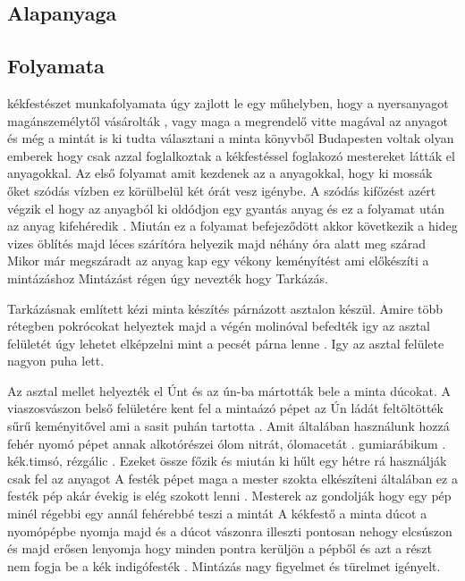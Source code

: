 \documentclass[fontsize=12pt, appendixprefix=true]{scrreprt}
\begin{document}
\subsection{Alapanyaga}




\subsection{Folyamata}
kékfestészet  munkafolyamata úgy zajlott le egy műhelyben, hogy a nyersanyagot magánszemélytől vásárolták ,  vagy maga a megrendelő vitte magával az anyagot és még a mintát is ki tudta választani  a minta könyvből
Budapesten voltak olyan emberek hogy csak azzal foglalkoztak a kékfestéssel foglakozó mestereket látták el anyagokkal.
Az első  folyamat amit kezdenek az a anyagokkal, hogy ki mossák őket szódás vízben ez körülbelül két órát vesz igénybe.
 A szódás kifőzést azért végzik el hogy az anyagból ki oldódjon egy gyantás anyag és ez a folyamat után  az anyag kifehéredik .
 Miután ez a folyamat befejeződött akkor következik a hideg vizes öblítés majd léces szárítóra helyezik majd néhány óra alatt meg szárad 
Mikor már megszáradt az anyag  kap egy vékony keményítést ami előkészíti a mintázáshoz 
Mintázást régen úgy nevezték  hogy Tarkázás.

Tarkázásnak említett kézi minta készítés  párnázott asztalon készül.
Amire több rétegben pokrócokat helyeztek majd a végén molinóval befedték igy az asztal felületét úgy lehetet elképzelni mint a pecsét párna lenne .
Igy az asztal felülete nagyon puha lett.

Az asztal mellet helyezték el Únt és az ún-ba mártották bele a minta dúcokat.
A viaszosvászon belső felületére kent fel a mintaázó pépet az Ún 
ládát feltöltötték sűrű keményitővel ami a sasit puhán tartotta .
Amit általában használunk hozzá  fehér nyomó pépet annak alkotórészei ólom nitrát, ólomacetát . gumiarábikum . kék.timsó, rézgálic .
Ezeket össze főzik és miután ki hűlt egy hétre rá használják csak fel  az anyagot 
A festék pépet  maga a mester szokta elkészíteni általában ez a festék pép akár évekig is elég szokott lenni .
 Mesterek  az gondolják hogy egy pép minél régebbi egy  annál fehérebbé teszi a mintát
A kékfestő a minta  dúcot a nyomópépbe nyomja majd és a dúcot vászonra illeszti pontosan nehogy elcsúszon és majd erősen lenyomja hogy minden pontra kerüljön a pépből és azt a részt nem fogja be a kék  indigófesték .
Mintázás nagy figyelmet és türelmet igényelt.
\end{document}
